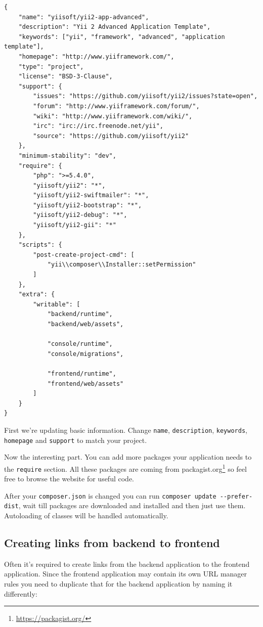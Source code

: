 \lstset{language=json}\begin{lstlisting}
{
    "name": "yiisoft/yii2-app-advanced",
    "description": "Yii 2 Advanced Application Template",
    "keywords": ["yii", "framework", "advanced", "application template"],
    "homepage": "http://www.yiiframework.com/",
    "type": "project",
    "license": "BSD-3-Clause",
    "support": {
        "issues": "https://github.com/yiisoft/yii2/issues?state=open",
        "forum": "http://www.yiiframework.com/forum/",
        "wiki": "http://www.yiiframework.com/wiki/",
        "irc": "irc://irc.freenode.net/yii",
        "source": "https://github.com/yiisoft/yii2"
    },
    "minimum-stability": "dev",
    "require": {
        "php": ">=5.4.0",
        "yiisoft/yii2": "*",
        "yiisoft/yii2-swiftmailer": "*",
        "yiisoft/yii2-bootstrap": "*",
        "yiisoft/yii2-debug": "*",
        "yiisoft/yii2-gii": "*"
    },
    "scripts": {
        "post-create-project-cmd": [
            "yii\\composer\\Installer::setPermission"
        ]
    },
    "extra": {
        "writable": [
            "backend/runtime",
            "backend/web/assets",

            "console/runtime",
            "console/migrations",

            "frontend/runtime",
            "frontend/web/assets"
        ]
    }
}
\end{lstlisting}
First we're updating basic information. Change \lstinline|name|, \lstinline|description|, \lstinline|keywords|, \lstinline|homepage| and \lstinline|support| to match
your project.

Now the interesting part. You can add more packages your application needs to the \lstinline|require| section.
All these packages are coming from packagist.org\footnote{\url{https://packagist.org/}} so feel free to browse the website for useful code.

After your \lstinline|composer.json| is changed you can run \lstinline|composer update --prefer-dist|, wait till packages are downloaded and
installed and then just use them. Autoloading of classes will be handled automatically.

\subsection{Creating links from backend to frontend}
Often it's required to create links from the backend application to the frontend application. Since the frontend application may
contain its own URL manager rules you need to duplicate that for the backend application by naming it differently:

